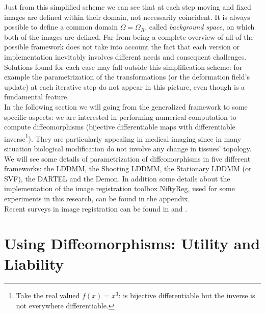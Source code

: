 \noindent
Just from this simplified scheme we can see that at each step moving and fixed images are defined within their domain, not necessarily coincident. 
It is always possible to define a common domain $\Omega = \Omega_{R}$, called  \emph{background space}, on which both of the images are defined.
%
\noindent
Far from being a complete overview of all of the possible framework does not take into account the fact that each version or implementation inevitably involves different needs and consequent challenges. Solutions found for each case may fall outside this simplification scheme: for example the parametrization of the transformations (or the deformation field's update) at each iterative step do not appear in this picture, even though is a fundamental feature. \\
In the following section we will going from the generalized framework to some specific aspects: we are interested in performing numerical computation to compute diffeomorphisms (bijective differentiable maps with differentiable inverse\footnote{Take the real valued $f(x)=x^3$: is bijective differentiable but the inverse is not everywhere differentiable.}). They are particularly appealing in medical imaging since in many situation biological modification do not involve any change in tissues' topology. We will see some details of parametrization of diffeomorphisms in five different frameworks: the LDDMM, the Shooting LDDMM, the Stationary LDDMM (or SVF), the DARTEL and the Demon.  In addition some details about the implementation of the image registration toolbox NiftyReg, used for some experiments in this research, can be found in the appendix.\\
Recent surveys in image registration can be found in \cite{Sotiras:survey:13} and \cite{Hill:survey:01}.

\section{Using Diffeomorphisms: Utility and Liability}

